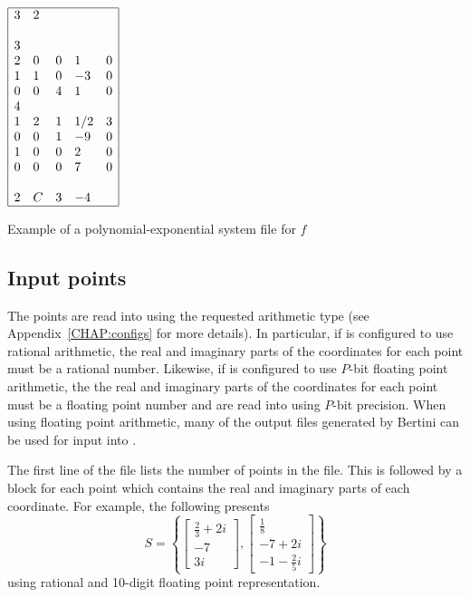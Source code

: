 \documentclass[11pt]{report}
\begin{document}
\begin{table}[h!]
\centering
$\begin{array}{|lllll|}
\hline
3 & 2 & & & \\
& & & & \\
3 & & & & \\
2 & 0 & 0 & 1  & 0 \\
1 & 1 & 0 & -3 & 0 \\
0 & 0 & 4 & 1  & 0 \\
4 & & & & \\
1 & 2 & 1 & 1/2 & 3 \\
0 & 0 & 1 & -9 & 0 \\
1 & 0 & 0 & 2 & 0 \\
0 & 0 & 0 & 7 & 0 \\
  &   &   &   &   \\
2 & C & 3 & -4 &  \\
\hline
\end{array}$
\caption{Example of a polynomial-exponential system file for $f$}\label{Tab:PolyExpSys}
\end{table}

\subsection{Input points}\label{SEC:Points}

The points are read into \blueharvestS using the requested arithmetic type (see Appendix~\ref{CHAP:configs}
for more details).  In particular, if \blueharvestS is configured to use rational arithmetic,
the real and imaginary parts of the coordinates for each point must be a rational number.
Likewise, if \blueharvestS is configured to use $P$-bit floating point arithmetic, the
the real and imaginary parts of the coordinates for each point
must be a floating point number and are read into \blueharvestS using $P$-bit precision.
When using floating point arithmetic, many of the output files
generated by Bertini \cite{Bertini} can be used for input into \blueharvest.

The first line of the file lists the number of points in the file.
This is followed by a block for each point which contains the real and imaginary
parts of each coordinate.
For example, the following presents
$$S = \left\{\left[\begin{array}{c} \frac{2}{3}+2i \\ -7 \\ 3i \end{array}\right],
\left[\begin{array}{c} \frac{1}{8} \\ -7+2i \\ -1-\frac{2}{5}i \end{array}\right]\right\}$$
using rational and 10-digit floating point representation.
\end{document}
